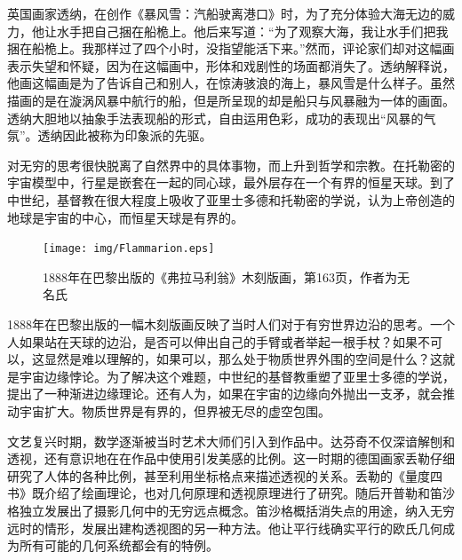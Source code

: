 \documentclass{article}
\begin{document}
英国画家透纳，在创作《暴风雪：汽船驶离港口》时，为了充分体验大海无边的威力，他让水手把自己捆在船桅上。他后来写道：“为了观察大海，我让水手们把我捆在船桅上。我那样过了四个小时，没指望能活下来。”然而，评论家们却对这幅画表示失望和怀疑，因为在这幅画中，形体和戏剧性的场面都消失了。透纳解释说，他画这幅画是为了告诉自己和别人，在惊涛骇浪的海上，暴风雪是什么样子。虽然描画的是在漩涡风暴中航行的船，但是所呈现的却是船只与风暴融为一体的画面。透纳大胆地以抽象手法表现船的形式，自由运用色彩，成功的表现出“风暴的气氛”。透纳因此被称为印象派的先驱。

对无穷的思考很快脱离了自然界中的具体事物，而上升到哲学和宗教。在托勒密的宇宙模型中，行星是嵌套在一起的同心球，最外层存在一个有界的恒星天球。到了中世纪，基督教在很大程度上吸收了亚里士多德和托勒密的学说，认为上帝创造的地球是宇宙的中心，而恒星天球是有界的。

\begin{figure}[htbp]
 \centering
 \texttt{[image: img/Flammarion.eps]}
 \captionsetup{labelformat=empty}
 \caption{1888年在巴黎出版的《弗拉马利翁》木刻版画，第163页，作者为无名氏}
 \label{fig:Flamarion-woodcut}
\end{figure}




1888年在巴黎出版的一幅木刻版画反映了当时人们对于有穷世界边沿的思考。一个人如果站在天球的边沿，是否可以伸出自己的手臂或者举起一根手杖？如果不可以，这显然是难以理解的，如果可以，那么处于物质世界外围的空间是什么？这就是宇宙边缘悖论。为了解决这个难题，中世纪的基督教重塑了亚里士多德的学说，提出了一种渐进边缘理论。还有人为，如果在宇宙的边缘向外抛出一支矛，就会推动宇宙扩大。物质世界是有界的，但界被无尽的虚空包围。

文艺复兴时期，数学逐渐被当时艺术大师们引入到作品中。达芬奇不仅深谙解刨和透视，还有意识地在在作品中使用引发美感的比例。这一时期的德国画家丢勒仔细研究了人体的各种比例，甚至利用坐标格点来描述透视的关系。丢勒的《量度四书》既介绍了绘画理论，也对几何原理和透视原理进行了研究。随后开普勒和笛沙格独立发展出了摄影几何中的无穷远点概念。笛沙格概括消失点的用途，纳入无穷远时的情形，发展出建构透视图的另一种方法。他让平行线确实平行的欧氏几何成为所有可能的几何系统都会有的特例。
\end{document}
